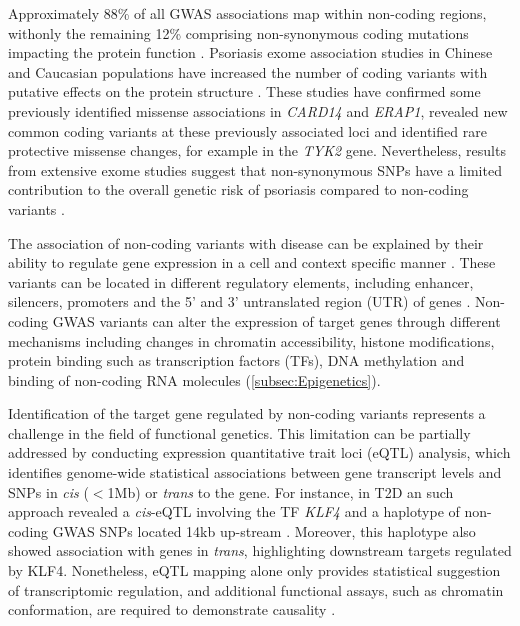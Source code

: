 Approximately 88\% of all GWAS associations map within non-coding regions, withonly the remaining 12\% comprising non-synonymous coding mutations impacting the protein function \parencite{Welter2013}. Psoriasis exome association studies in Chinese and Caucasian populations have increased the number of coding variants with putative effects on the protein structure \parencite{Tang2014, Zuo2015, Dand2017}. These studies have confirmed some  previously identified missense associations in \textit{CARD14} and \textit{ERAP1}, revealed new common coding variants at these previously associated loci and identified rare protective missense changes, for example in the \textit{TYK2} gene\parencite{Tang2014,Dand2017}. Nevertheless, results from extensive exome studies suggest that non-synonymous SNPs have a limited contribution to the overall genetic risk of psoriasis compared to non-coding variants \parencite{Tang2014}.

The association of non-coding variants with disease can be explained by their ability to regulate gene expression in a cell and context specific manner \parencite{Fairfax2012}. These variants can be located in different regulatory elements, including enhancer, silencers, promoters and the 5' and 3' untranslated region (UTR) of genes \parencite{Ward2012}. Non-coding GWAS variants can alter the expression of target genes through different mechanisms including changes in chromatin accessibility, histone modifications, protein binding such as transcription factors (TFs), DNA methylation and binding of non-coding  RNA molecules\parencite{Knight2014} (\ref{subsec:Epigenetics}).

Identification of the target gene regulated by non-coding variants represents a challenge in the field of functional genetics. This limitation can be partially addressed by conducting expression quantitative trait loci (eQTL) analysis, which identifies genome-wide statistical associations between gene transcript levels and SNPs in \textit{cis} ($<$1Mb) or \textit{trans} to the gene. For instance, in T2D an such approach revealed a \textit{cis}-eQTL involving the TF \textit{KLF4} and a haplotype of non-coding GWAS SNPs located 14kb up-stream \parencite{Small2011}. Moreover, this haplotype also showed association with genes in \textit{trans}, highlighting downstream targets regulated by KLF4. Nonetheless, eQTL mapping alone only provides statistical suggestion of transcriptomic regulation, and additional functional assays, such as chromatin conformation, are required to demonstrate causality \parencite{Edwards2013}.  
 



